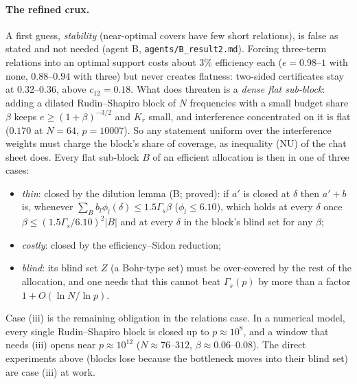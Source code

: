 \documentclass[11pt]{article}
\theoremstyle{definition}
\begin{document}
\paragraph{The refined crux.}  A first guess, \emph{stability} (near-optimal covers have few short relations), is false as stated and not
needed (agent B, \texttt{agents/B\_result2.md}).  Forcing three-term relations into an optimal support costs about $3\%$ efficiency each
($e=0.98$--$1$ with none, $0.88$--$0.94$ with three) but never creates flatness: two-sided certificates stay at $0.32$--$0.36$, above $c_{12}=0.18$.  What does
threaten is a \emph{dense flat sub-block}: adding a dilated Rudin--Shapiro block of $N$ frequencies with a small budget share $\beta$ keeps $e\ge(1+\beta)^{-3/2}$ and $K_r$ small,
and interference concentrated on it is flat ($0.170$ at $N=64$, $p=10007$).  So any statement uniform over the interference weights must charge the block's
share of coverage, as inequality (NU) of the chat sheet does.  Every flat sub-block $B$ of an efficient allocation is then in one of three cases:
\begin{itemize}
\item[(i)] \emph{thin}: closed by the dilution lemma (B; proved): if $a'$ is closed at $\delta$ then $a'+b$ is, whenever $\sum_Bb_l\phi_l(\delta)\le1.5\Gamma_s\beta$ ($\phi_l\le6.10$), which holds at every
$\delta$ once $\beta\le(1.5\Gamma_s/6.10)^2|B|$ and at every $\delta$ in the block's blind set for any $\beta$;
\item[(ii)] \emph{costly}: closed by the efficiency--Sidon reduction;
\item[(iii)] \emph{blind}: its blind set $Z$ (a Bohr-type set) must be over-covered by the rest of the allocation, and one needs that this cannot beat $\Gamma_s(p)$ by more than
a factor $1+O(\ln N/\ln p)$.
\end{itemize}
Case (iii) is the remaining obligation in the relations case.  In a numerical model, every single Rudin--Shapiro block is closed up to $p\approx10^8$, and a window that needs (iii) opens near
$p\approx10^{12}$ ($N\approx76$--$312$, $\beta\approx0.06$--$0.08$).  The direct experiments above (blocks lose because the bottleneck moves into their blind set) are case (iii) at work.
\end{document}

